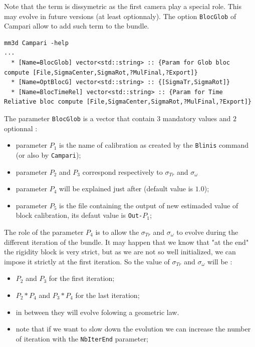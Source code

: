 Note that the term is  dissymetric as the first camera play a special role. 
This may evolve in future versions (at least optionnaly).
The option  {\tt BlocGlob} of Campari allow to add such term to the bundle. 

\begin{verbatim}
mm3d Campari -help
...
  * [Name=BlocGlob] vector<std::string> :: {Param for Glob bloc compute [File,SigmaCenter,SigmaRot,?MulFinal,?Export]}
  * [Name=OptBlocG] vector<std::string> :: {[SigmaTr,SigmaRot]}
  * [Name=BlocTimeRel] vector<std::string> :: {Param for Time Reliative bloc compute [File,SigmaCenter,SigmaRot,?MulFinal,?Export]}

\end{verbatim}

The parameter {\tt BlocGlob} is a vector that  contain $3$ mandatory values  and $2$ optionnal :

\begin{itemize}
    \item parameter $P_1$ is the name of calibration as created by the {\tt Blinis} command (or also by 
          {\tt Campari});
    \item parameter $P_2$ and $P_3$ correspond respectively to  $\sigma_{Tr}$ and $\sigma_{\omega}$
    \item  parameter $P_4$ will be explained just after (default value is $1.0$);
    \item  parameter $P_5$ is the file containing the output of new estimaded value of block calibration,
           its defaut value is {\tt Out-}$P_1$;
\end{itemize}

The role of the parameter $P_4$ is to allow the  $\sigma_{Tr}$ and $\sigma_{\omega}$ to evolve during
the different iteration of the bundle. It may happen that we know that "at the end" the rigidity block
is very strict, but as we are not so well initialized, we can impose it strictly at the first iteration.
So the value of $\sigma_{Tr}$ and $\sigma_{\omega}$ will be :

\begin{itemize}
    \item $P_2$ and $P_3$ for the first iteration;
    \item $P_2*P_4$ and $P_3*P_4$ for the last iteration;
    \item in between they will evolve folowing a geometric law.
    \item note that if we want to slow down the evolution we can increase the number of iteration
          with the {\tt NbIterEnd} parameter;
\end{itemize}

